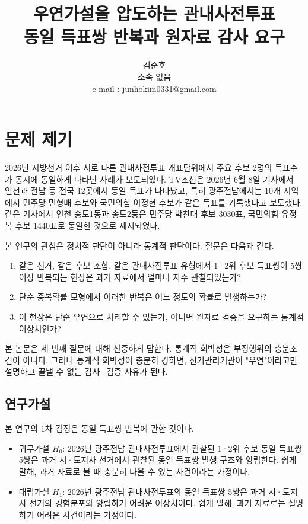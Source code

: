 \documentclass[preprint]{IEIE}
\title{우연가설을 압도하는 관내사전투표\\동일 득표쌍 반복과 원자료 감사 요구}
\author{김준호 \\ 소속 없음 \\ e-mail : junhokim0331@gmail.com}
\begin{document}
\maketitle
\makeabstract

\section{문제 제기}

2026년 지방선거 이후 서로 다른 관내사전투표 개표단위에서 주요 후보 2명의 득표수가 동시에 동일하게 나타난 사례가 보도되었다. TV조선은 2026년 6월 8일 기사에서 인천과 전남 등 전국 12곳에서 동일 득표가 나타났고, 특히 광주전남에서는 10개 지역에서 민주당 민형배 후보와 국민의힘 이정현 후보가 같은 득표를 기록했다고 보도했다. 같은 기사에서 인천 송도1동과 송도2동은 민주당 박찬대 후보 3030표, 국민의힘 유정복 후보 1440표로 동일한 것으로 제시되었다.

본 연구의 관심은 정치적 판단이 아니라 통계적 판단이다. 질문은 다음과 같다.

\begin{enumerate}
\item 같은 선거, 같은 후보 조합, 같은 관내사전투표 유형에서 1·2위 후보 득표쌍이 5쌍 이상 반복되는 현상은 과거 자료에서 얼마나 자주 관찰되었는가?
\item 단순 중복확률 모형에서 이러한 반복은 어느 정도의 확률로 발생하는가?
\item 이 현상은 단순 우연으로 처리할 수 있는가, 아니면 원자료 검증을 요구하는 통계적 이상치인가?
\end{enumerate}

본 논문은 세 번째 질문에 대해 신중하게 답한다. 통계적 희박성은 부정행위의 충분조건이 아니다. 그러나 통계적 희박성이 충분히 강하면, 선거관리기관이 "우연"이라고만 설명하고 끝낼 수 없는 감사·검증 사유가 된다.

\subsection{연구가설}

본 연구의 1차 검정은 동일 득표쌍 반복에 관한 것이다.

\begin{itemize}
\item 귀무가설 \(H_0\): 2026년 광주전남 관내사전투표에서 관찰된 1·2위 후보 동일 득표쌍 5쌍은 과거 시·도지사 선거에서 관찰된 동일 득표쌍 발생 구조와 양립한다. 쉽게 말해, 과거 자료로 볼 때 충분히 나올 수 있는 사건이라는 가정이다.
\item 대립가설 \(H_1\): 2026년 광주전남 관내사전투표의 동일 득표쌍 5쌍은 과거 시·도지사 선거의 경험분포와 양립하기 어려운 이상치이다. 쉽게 말해, 과거 자료로는 설명하기 어려운 사건이라는 가정이다.
\end{itemize}
\end{document}
